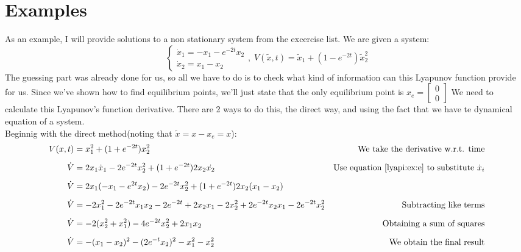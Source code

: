 \section{Examples}
As an example, I will provide solutions to a non stationary system from the excercise list.
{
    We are given a system:
    \begin{equation}
        \label{lyapi:ex:e}
        \begin{cases}
            \dot{x}_1 = -x_1-e^{-2t}x_2\\
            \dot{x}_2 = x_1 - x_2
        \end{cases}
        ,\; V(\tilde{x},t) = \tilde{x}_1+(1-e^{-2t})\tilde{x}_2^{2}
    \end{equation}
    The guessing part was already done for us, so all we have to do is to check what kind of information can this Lyapunov function provide for us.
    Since we've shown how to find equilibrium points, we'll just state that the only equilibrium point is $x_e = \begin{bmatrix}
        0\\
        0
        \end{bmatrix}$ 
    We need to calculate this Lyapunov's function derivative. There are 2 ways to do this, the direct way, and using the fact that we have te dynamical equation of a system.%
    \\
    Beginnig with the direct method(noting that $\tilde{x} = x-x_e=x$):\\
    \begin{equation}
        \begin{aligned}
            V(x,t)&=x_1^{2} + (1+e^{-2t})x_2^{2}&\mbox{We take the derivative w.r.t. time}\\[1.25ex]
            \dot{V}&=2x_1\dot{x}_1 -2e^{-2t}x_2^{2} + (1+e^{-2t})2x_2\dot{x_2}&\mbox{Use equation \ref{lyapi:ex:e} to substitute $\dot{x}_i$}\\[1.25ex]
            \dot{V}&=2x_1(-x_1-e^{2t}x_2)-2e^{-2t}x_2^{2} + (1+e^{-2t})2x_2(x_1-x_2)&\mbox{}\\[1.25ex]
            \dot{V}&=-2x_1^{2} -2e^{-2t}x_1x_2-2e^{-2t}+2x_2x_1-2x_2^{2}+2e^{-2t}x_2x_1-2e^{-2t}x_2^{2}&\mbox{Subtracting like terms}\\[1.25ex]
            \dot{V}&=-2(x_2^{2}+x_1^{2})-4e^{-2t}x_2^{2}+2x_1x_2&\mbox{Obtaining a sum of squares}\\[1.25ex]
            \dot{V}&=-(x_1-x_2)^{2}-(2e^{-t}x_2)^{2}-x_1^{2}-x_2^{2}&\mbox{We obtain the final result}\\[1.25ex]

\end{aligned}
\end{equation}}
